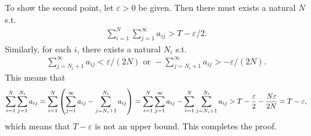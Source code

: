 \documentclass[12pt]{article}
\begin{document}
\begin{fproof}[3(b)]
 To show the second point, let \(\varepsilon > 0\) be given.
 Then there must exists a natural \(N\) s.t.
 \begin{align*}
    \sum_{i=1}^{N} \sum_{j=1}^{\infty} a_{ij} > T - \varepsilon/2.
 \end{align*}
 Similarly, for each \(i\), there exists a natural \(N_i\) s.t. 
 \begin{align*}
    \sum_{j=N_i+1}^{\infty} a_{ij} < \varepsilon/(2N) \text{ or } -\sum_{j=N_i+1}^{\infty} a_{ij} > -\varepsilon/(2N).
 \end{align*}
 This means that
 \begin{align*}
    \sum_{i=1}^{N} \sum_{j=1}^{N_i} a_{ij} 
    = \sum_{i=1}^{N} \left( \sum_{j=1}^{\infty} a_{ij} - \sum_{j=N_i+1}^{N_i} a_{ij} \right) = \sum_{i=1}^{N}\sum_{j=1}^{\infty} a_{ij} - \sum_{i=1}^{N}\sum_{j=N_i+1}^{N_i} a_{ij} > T - \frac{\varepsilon}{2} -\frac{N \varepsilon}{2N} = T - \varepsilon,
 \end{align*}
 which means that \(T -\varepsilon\) is not an upper bound.
 This completes the proof.
\end{fproof}

\begin{fproof}[3(c)]
 
\end{fproof}
\newpage
\end{document}
